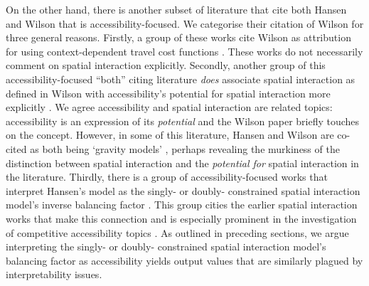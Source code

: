 \documentclass[
  10pt,
  letterpaper,
]{article}
\begin{document}
On the other hand, there is another subset of literature that cite both
Hansen \citep{hansen1959} and Wilson \citep{wilson1971} that is
accessibility-focused. We categorise their citation of Wilson
\citep{wilson1971} for three general reasons. Firstly, a group of these
works cite Wilson \citep{wilson1971} as attribution for using
context-dependent travel cost functions
\citep[e.g.,][]{weibullNumericalMeasurementAccessibility1980, handyMeasuringAccessibilityExploration1997, kwan1998space, shenLocationCharacteristicsInnercity1998, ashiru2003space, rau2012spatial, pan2013impacts, margaridacondecomelhoradoImpactMeasuringInternal2016, caschili2015accessibility, grengs2015nonwork, pan2020measuring, chia2020extending, roblot2021participation, sharifiasl2023incorporating, kharel2024examining}.
These works do not necessarily comment on spatial interaction
explicitly. Secondly, another group of this accessibility-focused
``both'' citing literature \emph{does} associate spatial interaction as
defined in Wilson \citep{wilson1971} with accessibility's potential for
spatial interaction more explicitly
\citep[e.g.,][]{millerMeasuringSpaceTimeAccessibility1999, giuliano2010accessibility, grengs2010intermetropolitan, grengs2010job, grengs2012equity, levine2012does, levinson2012positive, tong2015transportation, liu2015spatial, he2017measuring, wuUnifyingAccess2020, ng2022reflection, naqavi2023mobility, suel2024measuring}.
We agree accessibility and spatial interaction are related topics:
accessibility is an expression of its \emph{potential} and the Wilson
\citep{wilson1971} paper briefly touches on the concept. However, in
some of this literature, Hansen \citep{hansen1959} and Wilson
\citep{wilson1971} are co-cited as both being `gravity models'
\citep[e.g.,][]{liu2004accessibility, dai2017visualization, shen2019segregation, chia2020extending},
perhaps revealing the murkiness of the distinction between spatial
interaction and the \emph{potential for} spatial interaction in the
literature. Thirdly, there is a group of accessibility-focused works
that interpret Hansen's \citep{hansen1959} model as the singly- or
doubly- constrained spatial interaction model's inverse balancing factor
\citep[e.g.,][]{vickermanAccessibilityAttractionPotential1974}. This
group cities the earlier spatial interaction works that make this
connection and is especially prominent in the investigation of
competitive accessibility topics
\citep[e.g.,][]{karstEvaluationAccessibilityImpacts2003, geurs2006accessibility, willigers2007accessibility, el2011place, curtis2010planning, manaugh2012makes, chen2013regional, alonso2014labour, albacete2017measuring, sahebgharani2019computing, mayaud2019future, allenMeasureCompetitiveAccess2020, levinsonGeneralTheoryAccess2020, marwal2022literature, su2023untangling}.
As outlined in preceding sections, we argue interpreting the singly- or
doubly- constrained spatial interaction model's balancing factor as
accessibility yields output values that are similarly plagued by
interpretability issues.
\end{document}
